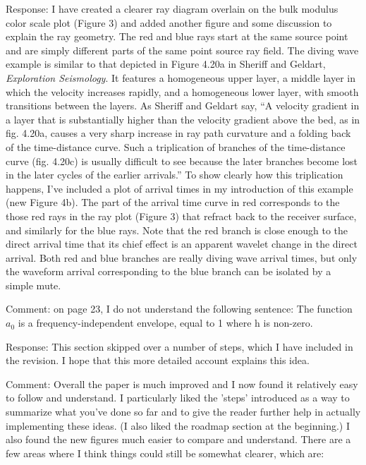 \documentclass[12pt]{article}
\begin{document}
Response: I have created a clearer ray diagram overlain on the bulk modulus color scale plot (Figure 3) and added another figure and some discussion to explain the ray geometry. The red and blue rays start at the same source point and are simply different parts of the same point source ray field. The diving wave example is similar to that depicted in Figure 4.20a in Sheriff and Geldart, {\em Exploration Seismology}. It features a homogeneous upper layer, a middle layer in which the velocity increases rapidly, and a homogeneous lower layer, with smooth transitions between the layers. As Sheriff and Geldart say, ``A velocity gradient in a layer that is substantially higher than the velocity gradient above the bed, as in fig. 4.20a, causes a very sharp increase in ray path curvature and a folding back of the time-distance curve. Such a triplication of branches of the time-distance curve (fig. 4.20c) is usually difficult to see because the later branches become lost in the later cycles of the earlier arrivals.'' To show clearly how this triplication happens, I've included a plot of arrival times in my introduction of this example (new Figure 4b). The part of the arrival time curve in red corresponds to the those red rays in the ray plot (Figure 3) that refract back to the receiver surface, and similarly for the blue rays. Note that the red branch is close enough to the direct arrival time that its chief effect is an apparent wavelet change in the direct arrival. Both red and blue branches are really diving wave arrival times, but only the waveform arrival corresponding to the blue branch can be isolated by a simple mute.

Comment: on page 23, I do not understand the following sentence:
The function $a_0$ is a frequency-independent envelope, equal to 1 where h is non-zero.

Response: This section skipped over a number of steps, which I have included in the revision. I hope that this more detailed account explains this idea.


Comment: Overall the paper is much improved and I now found it relatively easy to follow and understand.  I particularly liked the 'steps' introduced as a way to summarize what you've done so far and to give the reader further help in actually implementing these ideas.  (I also liked the roadmap section at the beginning.)  I also found the new figures much easier to compare and understand.
There are a few areas where I think things could still be somewhat clearer, which are:
\end{document}
